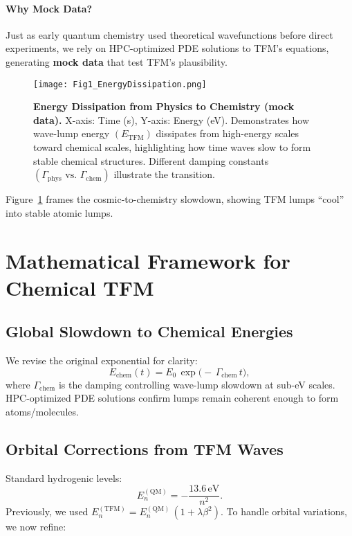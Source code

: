 \documentclass[12pt]{article}
\begin{document}
\paragraph{Why Mock Data?}
Just as early quantum chemistry used theoretical wavefunctions before direct experiments, we rely on HPC-optimized PDE solutions to TFM’s equations, generating \textbf{mock data} that test TFM’s plausibility.

\begin{figure}[ht]
  \centering
  \texttt{[image: Fig1\_EnergyDissipation.png]}
  \caption{
    \textbf{Energy Dissipation from Physics to Chemistry (mock data).} 
    X-axis: Time (s), Y-axis: Energy (eV). 
    Demonstrates how wave-lump energy \((E_{\mathrm{TFM}})\) dissipates from high-energy scales toward chemical scales, highlighting how time waves slow to form stable chemical structures. Different damping constants \((\Gamma_{\mathrm{phys}} \text{ vs. } \Gamma_{\mathrm{chem}})\) illustrate the transition.
  }
  \label{fig:energyDissipation}
\end{figure}

Figure~\ref{fig:energyDissipation} frames the cosmic-to-chemistry slowdown, showing TFM lumps “cool” into stable atomic lumps.

\section{Mathematical Framework for Chemical TFM}
\label{sec:MathFrame}

\subsection{Global Slowdown to Chemical Energies}
We revise the original exponential for clarity:
\begin{equation}
  E_{\mathrm{chem}}(t) 
  = 
  E_{0}\,
  \exp\bigl(-\,\Gamma_{\mathrm{chem}}\,t\bigr),
  \label{eq:EchemGlobalFixed}
\end{equation}
where $\Gamma_{\mathrm{chem}}$ is the damping controlling wave-lump slowdown at sub-eV scales. HPC-optimized PDE solutions confirm lumps remain coherent enough to form atoms/molecules.

\subsection{Orbital Corrections from TFM Waves}
\label{sec:OrbitalCorr}
Standard hydrogenic levels:
\[
  E_n^{(\mathrm{QM})}
  =
  -\frac{13.6\,\mathrm{eV}}{n^2}.
\]
Previously, we used $E_n^{(\mathrm{TFM})} = E_n^{(\mathrm{QM})}\,(1 + \lambda\beta^2)$. To handle orbital variations, we now refine:
\end{document}

